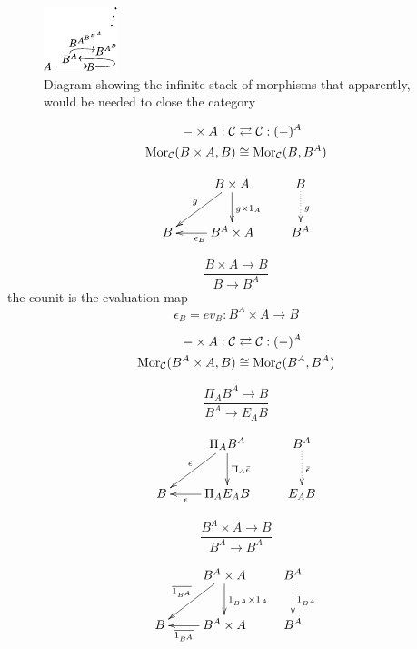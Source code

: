 \documentclass[aps,twocolumn]{revtex4-1}
\begin{document}
					
\begin{figure}
\noindent\includegraphics[width=0.45\columnwidth]{fig/mrcatinf.pdf}
\caption{Diagram showing the infinite stack of morphisms that apparently, would be needed to close the category}
\label{fig:hom}
\end{figure}


\begin{align*}
- \times A: \mathcal{C} & \rightleftarrows \mathcal{C}: (-)^A\\
\mathop{\rm Mor}\nolimits_{\mathcal{C}}(B \times A, B) & \cong  \mathop{\rm Mor}\nolimits_{\mathcal{C}}(B, B^A)
\end{align*}

			$$
			\xymatrix{
			& B \times A \ar[d]^{g \times 1_A} \ar[dl]_{\bar{g}} & B \ar@{.>}[d]^{g}\\
			B & B^A \times A \ar[l]^{\epsilon_B} & B^A}
			$$
	
		$$
			\frac{B \times A \longrightarrow B}{B \longrightarrow B^A}
		$$
		the counit is the evaluation map
		$$
			\epsilon_B = ev_B \colon B^A \times A \longrightarrow B
		$$
	
\begin{align*}
- \times A: \mathcal{C} & \rightleftarrows \mathcal{C}: (-)^A\\
\mathop{\rm Mor}\nolimits_{\mathcal{C}}(B^A \times A, B) & \cong  \mathop{\rm Mor}\nolimits_{\mathcal{C}}(B^A, B^A)
\end{align*}

		$$
			\frac{ \Pi_A B^A \longrightarrow B}{B^A \longrightarrow E_A B}
		$$

			$$
			\xymatrix{
			& \Pi_A B^A \ar[d]^{\Pi_A \bar{\epsilon}} \ar[dl]_{\epsilon} & B^A \ar@{.>}[d]^{\bar{\epsilon}}\\
			B & \Pi_A E_A B \ar[l]^-{\epsilon} & E_A B}
			$$
	
		$$
			\frac{B^A \times A \longrightarrow B}{B^A \longrightarrow B^A}
		$$
		
			$$
			\xymatrix{
			& B^A \times A \ar[d]^{1_{B^A} \times 1_A} \ar[dl]_{\overline{1_{B^A}}} & B^A \ar@{.>}[d]^{1_{B^A}}\\
			B & B^A \times A \ar[l]^-{\overline{1_{B^A}}} & B^A}
			$$
\end{document}
